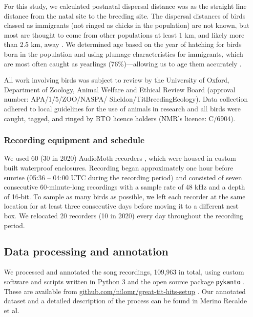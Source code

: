 For this study, we calculated postnatal dispersal distance was as the straight line distance from the natal site to the breeding site. The dispersal distances of birds classed as immigrants (not ringed as chicks in the population) are not known, but most are thought to come from other populations at least 1 km, and likely more than 2.5 km, away \autocite{verhulst1997, quinn2011}. We determined age based on the year of hatching for birds born in the population and using plumage characteristics for immigrants, which are most often caught as yearlings (76\%)---allowing us to age them accurately \autocite{woodman2023}.

All work involving birds was subject to review by the University of Oxford, Department of Zoology, Animal Welfare and Ethical Review Board (approval number: APA/1/5/ZOO/NASPA/ Sheldon/TitBreedingEcology). Data collection adhered to local guidelines for the use of animals in research and all birds were caught, tagged, and ringed by BTO licence holders (NMR's licence: C/6904).

\subsubsection{Recording equipment and schedule}
We used 60 (30 in 2020) AudioMoth recorders \parencite{hill2019}, which were housed in custom-built waterproof enclosures. Recording began approximately one hour before sunrise (05:36 -- 04:00 UTC during the recording period) and consisted of seven consecutive 60-minute-long recordings with a sample rate of 48 kHz and a depth of 16-bit. To sample as many birds as possible, we left each recorder at the same location for at least three consecutive days before moving it to a different nest box. We relocated 20 recorders (10 in 2020) every day throughout the recording period.

\subsection{Data processing and annotation}

We processed and annotated the song recordings, 109,963 in total, using custom software and scripts written in Python 3 \autocite{vanrossum1995} and the open source package \texttt{pykanto} \autocite{merinorecalde2023}. These are available from \href{https://github.com/nilomr/great-tit-hits-setup}{github.com/nilomr/great-tit-hits-setup} \autocite{nilo_gretidataset_setup_2023}. Our annotated dataset and a detailed description of the process can be found in Merino Recalde et al\autocite{merinorecalde2023a}. 

